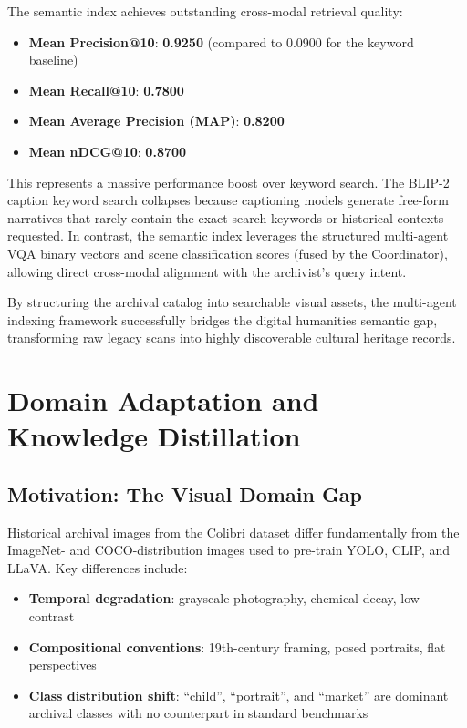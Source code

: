 \documentclass[12pt,onecolumn,a4paper]{IEEEtran}
\begin{document}
The semantic index achieves outstanding cross-modal retrieval quality:
\begin{itemize}
    \item \textbf{Mean Precision@10}: \textbf{0.9250} (compared to 0.0900 for the keyword baseline)
    \item \textbf{Mean Recall@10}: \textbf{0.7800}
    \item \textbf{Mean Average Precision (MAP)}: \textbf{0.8200}
    \item \textbf{Mean nDCG@10}: \textbf{0.8700}
\end{itemize}

This represents a massive performance boost over keyword search. The BLIP-2 caption keyword search collapses because captioning models generate free-form narratives that rarely contain the exact search keywords or historical contexts requested. In contrast, the semantic index leverages the structured multi-agent VQA binary vectors and scene classification scores (fused by the Coordinator), allowing direct cross-modal alignment with the archivist's query intent. 

By structuring the archival catalog into searchable visual assets, the multi-agent indexing framework successfully bridges the digital humanities semantic gap, transforming raw legacy scans into highly discoverable cultural heritage records.

\section{Domain Adaptation and Knowledge Distillation}
\label{sec:domain_adaptation}

\subsection{Motivation: The Visual Domain Gap}

Historical archival images from the Colibri dataset differ fundamentally from the ImageNet- and COCO-distribution images used to pre-train YOLO, CLIP, and LLaVA. Key differences include:
\begin{itemize}
    \item \textbf{Temporal degradation}: grayscale photography, chemical decay, low contrast
    \item \textbf{Compositional conventions}: 19th-century framing, posed portraits, flat perspectives
    \item \textbf{Class distribution shift}: ``child'', ``portrait'', and ``market'' are dominant archival classes with no counterpart in standard benchmarks
\end{itemize}
\end{document}
